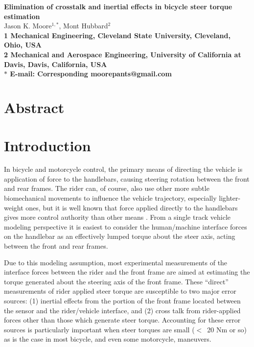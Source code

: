 \documentclass[10pt]{article}
\begin{document}
\begin{flushleft}
  {\Large
  \textbf{Elimination of crosstalk and inertial effects in bicycle
    steer torque estimation}
  }
  \\
  Jason K. Moore$^{1,\ast}$,
  Mont Hubbard$^{2}$
  \\
  \bf{1} Mechanical Engineering, Cleveland State University, Cleveland, Ohio, USA
  \\
  \bf{2} Mechanical and Aerospace Engineering, University of California at Davis, Davis, California, USA
  \\
  $\ast$ E-mail: Corresponding moorepants@gmail.com
\end{flushleft}

\section*{Abstract}


\section*{Introduction}

In bicycle and motorcycle control, the primary means of directing the
vehicle is application of force to the handlebars, causing steering rotation between the front
and rear frames. The rider can, of course, also use
other more subtle biomechanical movements to influence the vehicle trajectory,
 especially lighter-weight ones, but it is well known that force
applied directly to the handlebars gives more control authority than other means
\cite{Weir1972,Aoki1979,Sharp2007,Sharp2008a}. From a single track vehicle modeling perspective
 it is easiest to consider the human/machine interface forces on the handlebar as an effectively lumped 
torque about the steer axis, acting between the front and rear frames. 

Due to this modeling assumption, most
experimental measurements of the interface forces between the rider and the
front frame are aimed at estimating the torque generated about the steering axis
of the front frame. These ``direct'' measurements of rider applied steer torque are susceptible to two
major error sources: (1) inertial effects from the portion of the front frame
located between the sensor and the rider/vehicle interface, and (2) cross talk
from rider-applied forces other than those which generate steer torque.
Accounting for these error sources is particularly important when steer
torques are small ($<$~20 Nm or so) as is the case in most bicycle, and even
some motorcycle, maneuvers.
\end{document}
